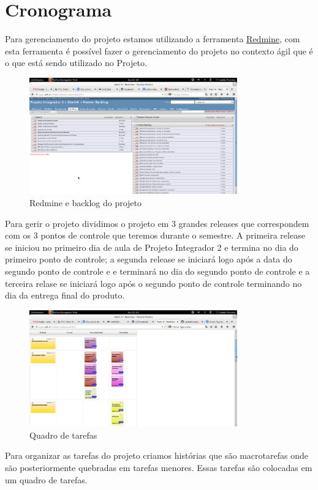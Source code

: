 \chapter[Cronograma]{Cronograma}

Para gerenciamento do projeto estamos utilizando a ferramenta \href{http://lappis.unb.br/redm}{Redmine}, com esta ferramenta é possível fazer o gerenciamento do projeto no contexto ágil que é o que está sendo utilizado no Projeto.

\begin{figure}[h]
  \centering
  \includegraphics[width=0.8\textwidth]
      {figuras/backlogs.eps}
  \caption{Redmine e backlog do projeto}
  \label{redmine-backlog}
\end{figure}

Para gerir o projeto dividimos o projeto em 3 grandes releases que correspondem com os 3 pontos de controle que teremos durante o semestre. A primeira release se iniciou no primeiro dia de aula de Projeto Integrador 2 e termina no dia do primeiro ponto de controle; a segunda release se iniciará logo após a data do segundo ponto de controle e e terminará no dia do segundo ponto de controle e a terceira relase se iniciará logo após o segundo ponto de controle terminando no dia da entrega final do produto.

\begin{figure}[h]
  \centering
  \includegraphics[width=0.8\textwidth]
      {figuras/quadrotarefas.eps}
  \caption{Quadro de tarefas}
  \label{quadro-de-tarefas}
\end{figure}
Para organizar as tarefas do projeto criamos histórias que são macrotarefas onde são posteriormente quebradas em tarefas menores. Essas tarefas são colocadas em um quadro de tarefas.


  
